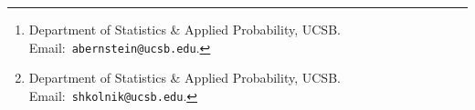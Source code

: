 \documentclass[12pt,leqno,letterpaper]{article}
\begin{document}
\ifxetex
  \let\lsum\sum
  \renewcommand{\sum}{\bm{\lsum}} 

  \let\lprod\prod
  \renewcommand{\prod}{\bm{\lprod}}
\else
\fi

\author{Alex Bernstein\footnote{Department of Statistics
\& Applied Probability, UCSB. Email:~{\tt abernstein@ucsb.edu}.} 
  ~~~ and ~~ Alex Shkolnik\footnote{Department of Statistics
\& Applied Probability, UCSB. Email:~{\tt shkolnik@ucsb.edu}.}}


\title{\vspace{-0.16in}{\bf \Large  Semi-explicit Solutions to 
Structured \\ Quadratic Programming}}

\date{\today}






\maketitle

\vspace{-0.16in}
\end{document}
